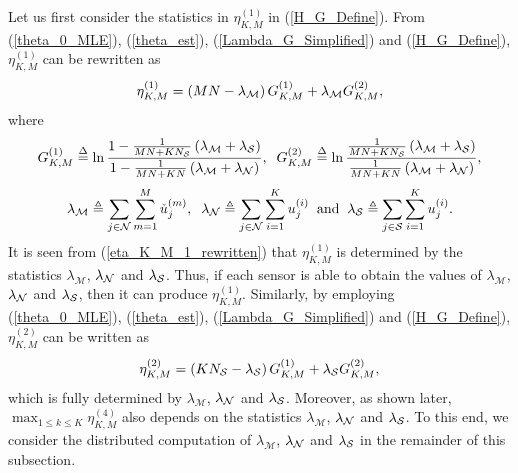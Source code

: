 \documentclass[11pt, draftclsnofoot, onecolumn]{IEEEtran}
\newcommand{\cM}{\mathcal{M}}
\newcommand{\cu}{{\check{u}}}
\begin{document}
Let us first consider the statistics in $\eta _{K,M}^{(1)}$ in (\ref{H_G_Define}).
From (\ref{theta_0_MLE}), (\ref{theta_est}), (\ref{Lambda_G_Simplified}) and (\ref{H_G_Define}), $\eta _{K,M}^{(1)}$ can be rewritten as
\begin{equation} \label{eta_K_M_1_rewritten}
\eta _{K,M}^{(1)} = \left( {MN - {\lambda _{\cal M}}} \right)G_{K,M}^{(1)} + {\lambda _{\cal M}}G_{K,M}^{(2)},
\end{equation}
where 
\begin{equation} \label{G_define}
G_{K,M}^{(1)} \buildrel \Delta \over = \ln \frac{{1 - \frac{1}{{MN + K{N_{\cal S}}}}\left( {{\lambda _{\cal M}} + {\lambda _{\cal S}}} \right)}}{{1 - \frac{1}{{MN + KN}}\left( {{\lambda _{\cal M}} + {\lambda _{\cal N}}} \right)}}, \;\; G_{K,M}^{(2)} \buildrel \Delta \over = \ln \frac{{\frac{1}{{MN + K{N_{\cal S}}}}\left( {{\lambda _{\cal M}} + {\lambda _{\cal S}}} \right)}}{{\frac{1}{{MN + KN}}\left( {{\lambda _{\cal M}} + {\lambda _{\cal N}}} \right)}},
\end{equation}
\begin{equation} \label{lambda_define}
{\lambda _\cM} \triangleq \sum\limits_{j \in {\cal N}} {\sum\limits_{m = 1}^M {\cu_j^{(m)}} } , \;\; {\lambda _{\cal N}} \triangleq \sum\limits_{j \in {\cal N}} {\sum\limits_{i = 1}^K {u_j^{(i)}} }  \;\; \text{and} \;\; {\lambda _{\cal S}} \triangleq \sum\limits_{j \in {\cal S}} {\sum\limits_{i = 1}^K {u_j^{(i)}} }. 
\end{equation}
It is seen from (\ref{eta_K_M_1_rewritten}) that $\eta _{K,M}^{(1)}$ is determined by the statistics ${\lambda _\cM}$, ${\lambda _{\cal N}} $ and ${\lambda _{\cal S}}$. Thus, if each sensor is able to obtain the values of ${\lambda _\cM}$, ${\lambda _{\cal N}} $ and ${\lambda _{\cal S}}$, then it can produce $\eta _{K,M}^{(1)}$. 
Similarly, by employing (\ref{theta_0_MLE}), (\ref{theta_est}), (\ref{Lambda_G_Simplified}) and (\ref{H_G_Define}), $\eta _{K,M}^{(2)}$ can be written as 
\begin{equation}
\eta _{K,M}^{(2)} = \left( {K{N_{\cal S}} - {\lambda _{\cal S}}} \right)G_{K,M}^{(1)} + {\lambda _{\cal S}}G_{K,M}^{(2)},
\end{equation}
which is fully determined by ${\lambda _\cM}$, ${\lambda _{\cal N}} $ and ${\lambda _{\cal S}}$. Moreover, as shown later, ${\max }_{1 \le k \le K}  \eta _{K,M}^{(4)}$ also depends on the statistics ${\lambda _\cM}$, ${\lambda _{\cal N}} $ and ${\lambda _{\cal S}}$. 
To this end, we consider the distributed computation of  ${\lambda _\cM}$, ${\lambda _{\cal N}} $ and ${\lambda _{\cal S}}$ in the remainder of this subsection.
\end{document}
